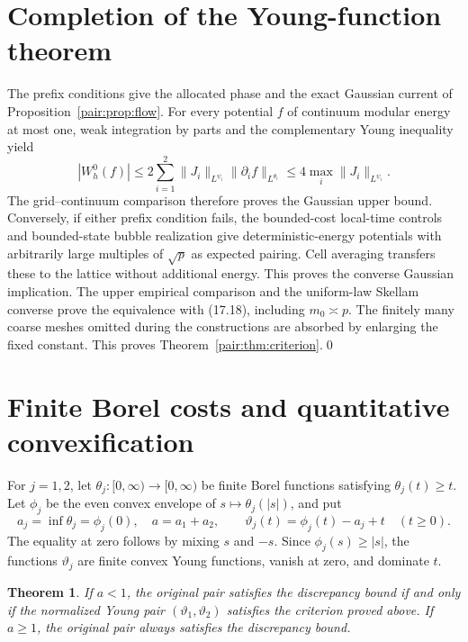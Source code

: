 \documentclass[11pt]{article}
\newtheorem{theorem}{Theorem}[section]
\numberwithin{equation}{section}
\begin{document}


\section{Completion of the Young-function theorem}
The prefix conditions give the allocated phase and the exact Gaussian
current of Proposition~\ref{pair:prop:flow}. For every potential $f$
of continuum modular energy at most one, weak integration by parts
and the complementary Young inequality yield
\[
 |W_h^0(f)|\le
 2\sum_{i=1}^2\|J_i\|_{L^{\psi_i}}\|\partial_i f\|_{L^{\theta_i}}
 \le4\max_i\|J_i\|_{L^{\psi_i}}.
\]
The grid--continuum comparison therefore proves the Gaussian upper
bound. Conversely, if either prefix condition fails, the bounded-cost
local-time controls and bounded-state bubble realization give
deterministic-energy potentials with arbitrarily large multiples of
$\sqrt p$ as expected pairing. Cell averaging transfers these to the
lattice without additional energy. This proves the converse Gaussian
implication. The upper empirical comparison and the uniform-law
Skellam converse prove the equivalence with (17.18), including
$m_0\asymp p$. The finitely many coarse meshes omitted during the
constructions are absorbed by enlarging the fixed constant. This proves
Theorem~\ref{pair:thm:criterion}.\qed


\section{Finite Borel costs and quantitative convexification}
\label{sec:finite-borel-relaxation}

For $j=1,2$, let $\theta_j:[0,\infty)\to[0,\infty)$ be finite Borel
functions satisfying $\theta_j(t)\ge t$. Let $\phi_j$ be the even
convex envelope of $s\mapsto\theta_j(|s|)$, and put
\[
 a_j=\inf\theta_j=\phi_j(0),\quad a=a_1+a_2,\qquad
 \vartheta_j(t)=\phi_j(t)-a_j+t\quad(t\ge0).
\]
The equality at zero follows by mixing $s$ and $-s$. Since
$\phi_j(s)\ge|s|$, the functions $\vartheta_j$ are finite convex
Young functions, vanish at zero, and dominate $t$.

\begin{theorem}\label{thm:finite-borel-pair-relaxation}
If $a<1$, the original pair satisfies the discrepancy bound if and
only if the normalized Young pair $(\vartheta_1,\vartheta_2)$
satisfies the criterion proved above. If $a\ge1$, the original
pair always satisfies the discrepancy bound.
\end{theorem}
\end{document}
